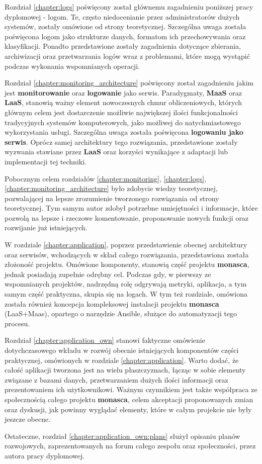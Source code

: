 Rozdział \ref{chapter:logs} poświęcony został głównemu zagadnieniu poniższej pracy dyplomowej - logom.
Te, często niedocenianie przez administratorów dużych systemów, zostały omówione od strony teoretycznej. Szczególna uwaga 
została poświęcona logom jako strukturze danych, formatom ich przechowywania oraz klasyfikacji. Ponadto przedstawione zostały 
zagadnienia dotyczące zbierania, archiwizacji oraz przetwarzania logów wraz z problemami, które mogą wystąpić 
podczas wykonania wspomnianych operacji.

Rozdział \ref{chapter:monitoring_architecture} poświęcony został zagadnieniu jakim jest
\textbf{monitorowanie} oraz \textbf{logowanie} jako serwis. Paradygmaty, \textbf{MaaS} oraz \textbf{LaaS}, stanowią ważny 
element nowoczesnych chmur obliczeniowych, których głównym celem jest dostarczenie możliwie największej ilości 
funkcjonalności tradycyjnych systemów komputerowych, jako możliwej do natychmiastowego wykorzystania usługi. Szczególna uwaga 
została poświęcona \textbf{logowaniu jako serwis}. Oprócz samej architektury tego rozwiązania, przedstawione zostały wyzwania 
stawiane przez \textbf{LaaS} oraz korzyści wynikające z adaptacji lub implementacji tej techniki.

Pobocznym celem rozdziałów \ref{chapter:monitoring}, \ref{chapter:logs}, \ref{chapter:monitoring_architecture} było zdobycie 
wiedzy teoretycznej, pozwalającej na lepsze zrozumienie tworzonego rozwiązania od strony teoretycznej. Tym samym autor zdobył 
potrzebne umiejętności i informacje, które pozwolą na lepsze i rzeczowe komentowanie, proponowanie nowych funkcji oraz rozwijanie już istniejących.  

W rozdziale \ref{chapter:application}, poprzez przedstawienie obecnej architektury oraz serwisów, wchodzących w skład całego 
rozwiązania, przedstawiona została złożoność projektu. Omówione komponenty, stanowią część projektu \textbf{monasca}, jednak
posiadają zupełnie odrębny cel. Podczas gdy, w pierwszy ze wspomnianych projektów, nadrzędną rolę odgrywają metryki,
aplikacja, a tym samym część praktyczna, skupia się na logach. W tym też rozdziale, omówiona została również
koncepcja kompleksowej instalacji projektu \textbf{monasca} (LaaS+Maas), opartego o narzędzie Ansible, 
służące do automatyzacji tego procesu.

Rozdział \ref{chapter:application_own} stanowi faktyczne omówienie dotychczasowego wkładu w rozwój obecnie istniejących
komponentów części praktycznej, omówionych w rozdziale \ref{chapter:application}. Warto dodać, że całość aplikacji tworzona 
jest na wielu płaszczyznach, łącząc w sobie elementy związane z bazami danych, przetwarzaniem dużych ilości informacji
oraz prezentowaniem ich użytkownikowi. Ważnym czynnikiem jest także współpraca ze społecznością całego 
projektu \textbf{monasca}, celem akceptacji proponowanych zmian oraz dyskusji, jak powinny wyglądać elementy, które w całym 
projekcie nie były jeszcze obecne.

Ostateczne, rozdział \ref{chapter:application_own:plans} służył opisaniu planów rozwojowych, zaprezentowanych na
forum całego zespołu oraz społeczności, przez autora pracy dyplomowej. 